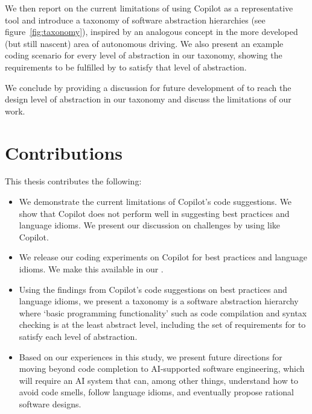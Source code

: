 We then report on the current limitations of \cct{} using Copilot as a representative tool and introduce a taxonomy of software abstraction hierarchies (see figure~\ref{fig:taxonomy}), inspired by an analogous concept in the more developed (but still nascent) area of autonomous driving. 
We also present an example coding scenario for every level of abstraction in our taxonomy, showing the requirements to be fulfilled by \cct{} to satisfy that level of abstraction.

We conclude by providing a discussion for future development of \cct{} to reach the design level of abstraction in our taxonomy and discuss the limitations of our work. 

\section{Contributions}

This thesis contributes the following:

\begin{itemize}
    \item We demonstrate the current limitations of Copilot's code suggestions. We show that Copilot does not perform well in suggesting best practices and language idioms. We present our discussion on challenges by using \cct{} like Copilot.
    \item We release our coding experiments on Copilot for best practices and language idioms. We make this available in our \repl{}.
    \item Using the findings from Copilot's code suggestions on best practices and language idioms, we present a taxonomy is a software abstraction hierarchy where ‘basic programming functionality’ such as code compilation and syntax checking is at the least abstract level, including the set of requirements for \cct{} to satisfy each level of abstraction.
    \item Based on our experiences in this study, we present future directions for moving beyond code completion to AI-supported software engineering, which will require an AI system that can, among other things, understand how to avoid code smells, follow language idioms, and eventually propose rational software designs.
\end{itemize}
